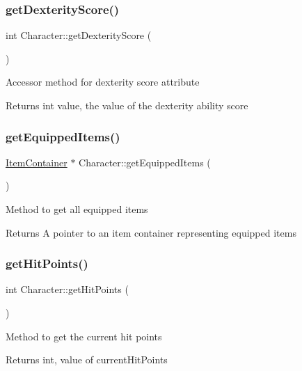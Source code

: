 \subsubsection{\texorpdfstring{get\+Dexterity\+Score()}{getDexterityScore()}}
{\footnotesize\ttfamily int Character\+::get\+Dexterity\+Score (\begin{DoxyParamCaption}{ }\end{DoxyParamCaption})}

Accessor method for dexterity score attribute \begin{DoxyReturn}{Returns}
int value, the value of the dexterity ability score 
\end{DoxyReturn}
\hypertarget{class_character_ad54a2ad63aa059d162cc67dbd0556f57}{}\label{class_character_ad54a2ad63aa059d162cc67dbd0556f57} 
\subsubsection{\texorpdfstring{get\+Equipped\+Items()}{getEquippedItems()}}
{\footnotesize\ttfamily \hyperlink{class_item_container}{Item\+Container} $\ast$ Character\+::get\+Equipped\+Items (\begin{DoxyParamCaption}{ }\end{DoxyParamCaption})}

Method to get all equipped items \begin{DoxyReturn}{Returns}
A pointer to an item container representing equipped items 
\end{DoxyReturn}
\hypertarget{class_character_ac28870a30c9b451f55c3e27adaabfbfa}{}\label{class_character_ac28870a30c9b451f55c3e27adaabfbfa} 
\subsubsection{\texorpdfstring{get\+Hit\+Points()}{getHitPoints()}}
{\footnotesize\ttfamily int Character\+::get\+Hit\+Points (\begin{DoxyParamCaption}{ }\end{DoxyParamCaption})}

Method to get the current hit points \begin{DoxyReturn}{Returns}
int, value of current\+Hit\+Points 
\end{DoxyReturn}
\hypertarget{class_character_a562aa6723aba380cbddcf7467b921afb}{}\label{class_character_a562aa6723aba380cbddcf7467b921afb} 
